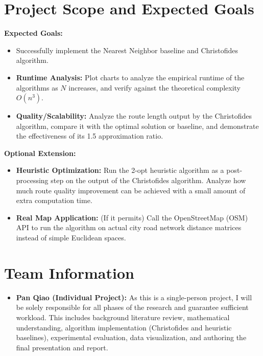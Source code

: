 \documentclass[10pt]{article}
\begin{document}
\section{Project Scope and Expected Goals}
\textbf{Expected Goals:}
\begin{itemize}
    \item Successfully implement the Nearest Neighbor baseline and Christofides algorithm.
    \item \textbf{Runtime Analysis:} Plot charts to analyze the empirical runtime of the algorithms as $N$ increases, and verify against the theoretical complexity $O(n^3)$.
    \item \textbf{Quality/Scalability:} Analyze the route length output by the Christofides algorithm, compare it with the optimal solution or baseline, and demonstrate the effectiveness of its 1.5 approximation ratio.
\end{itemize}

\textbf{Optional Extension:}
\begin{itemize}
    \item \textbf{Heuristic Optimization:} Run the 2-opt heuristic algorithm as a post-processing step on the output of the Christofides algorithm. Analyze how much route quality improvement can be achieved with a small amount of extra computation time.
    \item \textbf{Real Map Application:} (If it permits) Call the OpenStreetMap (OSM) API to run the algorithm on actual city road network distance matrices instead of simple Euclidean spaces.
\end{itemize}

\section{Team Information}
\begin{itemize}
    \item \textbf{Pan Qiao (Individual Project):} As this is a single-person project, I will be solely responsible for all phases of the research and guarantee sufficient workload. This includes background literature review, mathematical understanding, algorithm implementation (Christofides and heuristic baselines), experimental evaluation, data visualization, and authoring the final presentation and report.
\end{itemize}
\end{document}
